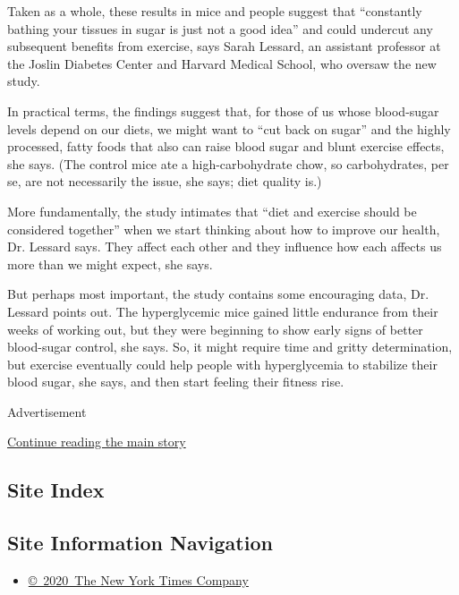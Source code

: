 Taken as a whole, these results in mice and people suggest that
``constantly bathing your tissues in sugar is just not a good idea'' and
could undercut any subsequent benefits from exercise, says Sarah
Lessard, an assistant professor at the Joslin Diabetes Center and
Harvard Medical School, who oversaw the new study.

In practical terms, the findings suggest that, for those of us whose
blood-sugar levels depend on our diets, we might want to ``cut back on
sugar'' and the highly processed, fatty foods that also can raise blood
sugar and blunt exercise effects, she says. (The control mice ate a
high-carbohydrate chow, so carbohydrates, per se, are not necessarily
the issue, she says; diet quality is.)

More fundamentally, the study intimates that ``diet and exercise should
be considered together'' when we start thinking about how to improve our
health, Dr. Lessard says. They affect each other and they influence how
each affects us more than we might expect, she says.

But perhaps most important, the study contains some encouraging data,
Dr. Lessard points out. The hyperglycemic mice gained little endurance
from their weeks of working out, but they were beginning to show early
signs of better blood-sugar control, she says. So, it might require time
and gritty determination, but exercise eventually could help people with
hyperglycemia to stabilize their blood sugar, she says, and then start
feeling their fitness rise.

Advertisement

\protect\hyperlink{after-bottom}{Continue reading the main story}

\hypertarget{site-index}{%
\subsection{Site Index}\label{site-index}}

\hypertarget{site-information-navigation}{%
\subsection{Site Information
Navigation}\label{site-information-navigation}}

\begin{itemize}
\tightlist
\item
  \href{https://help.nytimes3xbfgragh.onion/hc/en-us/articles/115014792127-Copyright-notice}{©~2020~The
  New York Times Company}
\end{itemize}

